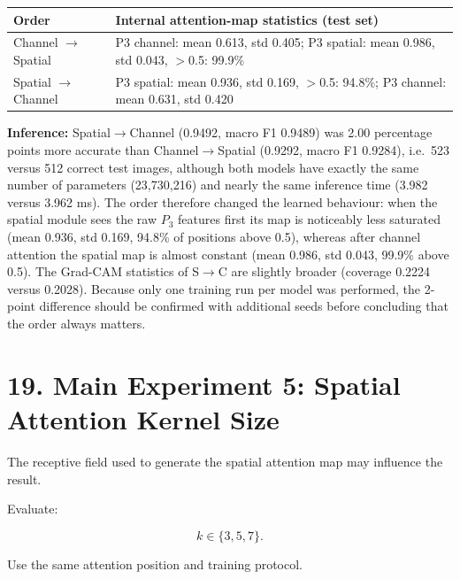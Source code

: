 \documentclass[10pt]{article}
\begin{document}
\begin{center}
\small
\begin{tabular}{|l|p{12cm}|}
\hline
\textbf{Order} & \textbf{Internal attention-map statistics (test set)} \\
\hline
Channel $\rightarrow$ Spatial & P3 channel: mean 0.613, std 0.405; P3 spatial: mean 0.986, std 0.043, $>$0.5: 99.9\% \\
\hline
Spatial $\rightarrow$ Channel & P3 spatial: mean 0.936, std 0.169, $>$0.5: 94.8\%; P3 channel: mean 0.631, std 0.420 \\
\hline
\end{tabular}
\end{center}

\textbf{Inference:} Spatial$\rightarrow$Channel (0.9492, macro F1 0.9489) was 2.00 percentage points more accurate than Channel$\rightarrow$Spatial (0.9292, macro F1 0.9284), i.e.\ 523 versus 512 correct test images,
although both models have exactly the same number of parameters (23{,}730{,}216) and nearly the same inference time (3.982 versus 3.962 ms). The order therefore changed the learned behaviour: when the spatial module sees the raw
$P_3$ features first its map is noticeably less saturated (mean 0.936, std 0.169, 94.8\% of positions above 0.5), whereas after channel attention the spatial map is almost constant (mean 0.986, std 0.043, 99.9\% above 0.5).
The Grad-CAM statistics of S$\rightarrow$C are slightly broader (coverage 0.2224 versus 0.2028). Because only one training run per model was performed, the 2-point difference should be confirmed with additional seeds before
concluding that the order always matters.

\section*{19. Main Experiment 5: Spatial Attention Kernel Size}

The receptive field used to generate the spatial attention map may influence
the result.

Evaluate:

\[
k\in\{3,5,7\}.
\]

Use the same attention position and training protocol.
\end{document}
